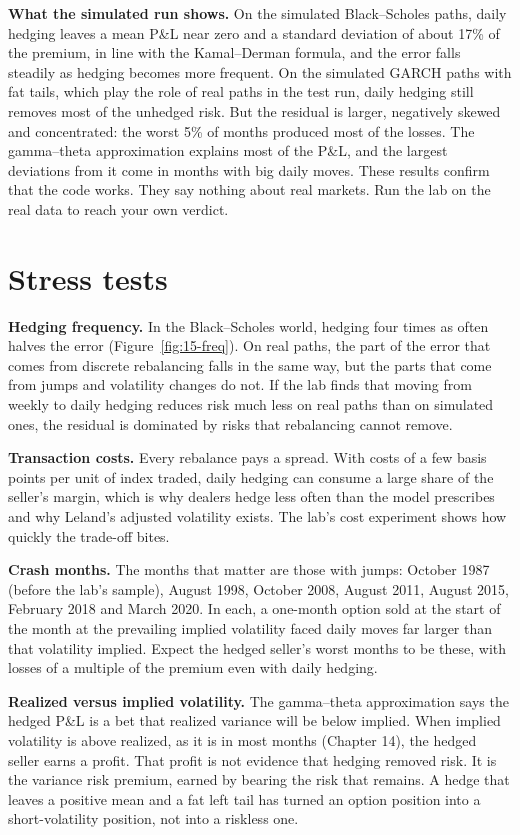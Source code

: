 \textbf{What the simulated run shows.} On the simulated Black--Scholes paths, daily hedging leaves a mean P\&L near zero and a standard deviation of about 17\% of the premium, in line with the Kamal--Derman formula, and the error falls steadily as hedging becomes more frequent. On the simulated GARCH paths with fat tails, which play the role of real paths in the test run, daily hedging still removes most of the unhedged risk. But the residual is larger, negatively skewed and concentrated: the worst 5\% of months produced most of the losses. The gamma--theta approximation explains most of the P\&L, and the largest deviations from it come in months with big daily moves. These results confirm that the code works. They say nothing about real markets. Run the lab on the real data to reach your own verdict.

\section{Stress tests}
\label{sec:15-stress}

\textbf{Hedging frequency.} In the Black--Scholes world, hedging four times as often halves the error (Figure~\ref{fig:15-freq}). On real paths, the part of the error that comes from discrete rebalancing falls in the same way, but the parts that come from jumps and volatility changes do not. If the lab finds that moving from weekly to daily hedging reduces risk much less on real paths than on simulated ones, the residual is dominated by risks that rebalancing cannot remove.

\textbf{Transaction costs.} Every rebalance pays a spread. With costs of a few basis points per unit of index traded, daily hedging can consume a large share of the seller's margin, which is why dealers hedge less often than the model prescribes and why Leland's adjusted volatility exists. The lab's cost experiment shows how quickly the trade-off bites.

\textbf{Crash months.} The months that matter are those with jumps: October 1987 (before the lab's sample), August 1998, October 2008, August 2011, August 2015, February 2018 and March 2020. In each, a one-month option sold at the start of the month at the prevailing implied volatility faced daily moves far larger than that volatility implied. Expect the hedged seller's worst months to be these, with losses of a multiple of the premium even with daily hedging.

\textbf{Realized versus implied volatility.} The gamma--theta approximation says the hedged P\&L is a bet that realized variance will be below implied. When implied volatility is above realized, as it is in most months (Chapter 14), the hedged seller earns a profit. That profit is not evidence that hedging removed risk. It is the variance risk premium, earned by bearing the risk that remains. A hedge that leaves a positive mean and a fat left tail has turned an option position into a short-volatility position, not into a riskless one.

